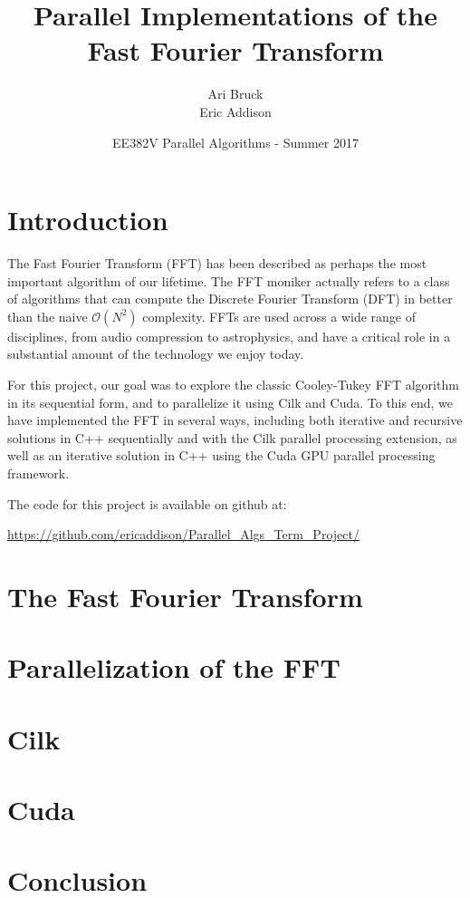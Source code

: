 \documentclass{article}
\title{Parallel Implementations of the\\Fast Fourier Transform}
\author{Ari Bruck\\Eric Addison }
\date{EE382V Parallel Algorithms - Summer 2017}
\begin{document}
\maketitle

\section{Introduction}
The Fast Fourier Transform (FFT) has been described as perhaps the most important algorithm of our lifetime. The FFT moniker actually refers to a class of algorithms that can compute the Discrete Fourier Transform (DFT) in better than the naive $\mathcal{O}(N^2)$ complexity. FFTs are used across a wide range of disciplines, from audio compression to astrophysics, and have a critical role in a substantial amount of the technology we enjoy today.

For this project, our goal was to explore the classic Cooley-Tukey FFT algorithm in its sequential form, and to parallelize it using Cilk and Cuda. To this end, we have implemented the FFT in several ways, including both iterative and recursive solutions in C++ sequentially and with the Cilk parallel processing extension, as well as an iterative solution in C++ using the Cuda GPU parallel processing framework.

The code for this project is available on github at: 
\begin{center}
\url{https://github.com/ericaddison/Parallel\_Algs\_Term\_Project/}
\end{center}


\section{The Fast Fourier Transform}


\section{Parallelization of the FFT}


\section{Cilk}


\section{Cuda}


\section{Conclusion}

\end{document}
